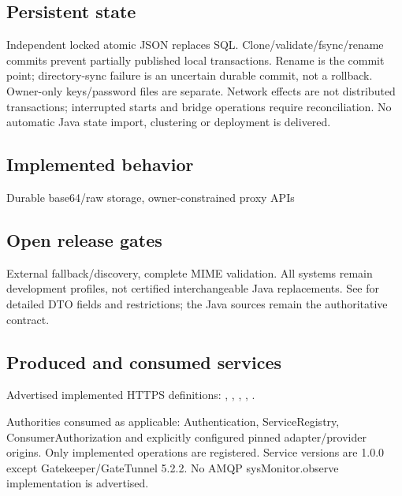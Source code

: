 \documentclass[a4paper]{arrowhead}
\begin{document}
\subsection{Persistent state}
Independent locked atomic JSON replaces SQL. Clone/validate/fsync/rename commits prevent partially published local transactions. Rename is the commit point; directory-sync failure is an uncertain durable commit, not a rollback. Owner-only keys/password files are separate. Network effects are not distributed transactions; interrupted starts and bridge operations require reconciliation. No automatic Java state import, clustering or deployment is delivered.
\subsection{Implemented behavior}
Durable base64/raw storage, owner-constrained proxy APIs
\subsection{Open release gates}
External fallback/discovery, complete MIME validation. All systems remain development profiles, not certified interchangeable Java replacements. See  for detailed DTO fields and restrictions; the Java sources remain the authoritative contract.
\subsection{Produced and consumed services}
Advertised implemented HTTPS definitions: , \allowbreak {}, \allowbreak {}, \allowbreak {}, \allowbreak {}.\par
Authorities consumed as applicable: Authentication, ServiceRegistry, ConsumerAuthorization and explicitly configured pinned adapter/provider origins. Only implemented operations are registered. Service versions are 1.0.0 except Gatekeeper/GateTunnel 5.2.2. No AMQP sysMonitor.observe implementation is advertised.
\clearpage
\end{document}
